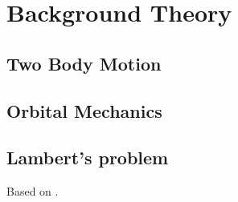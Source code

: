 
\section{Background Theory}


\subsection{Two Body Motion}


\subsection{Orbital Mechanics}


\subsection{Lambert's problem}


Based on \cite{Curtis2009}.


